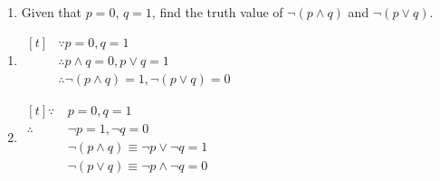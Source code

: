 \documentclass{report}
\begin{document}
\vspace{0.1cm}
\begin{enumerate}[label=\textbf{Example \arabic*}, leftmargin=*, start=13]
    \item Given that $p = 0$, $q = 1$, find the truth value of $\neg (p \land q)$ and
          $\neg (p \lor q)$.
\end{enumerate}

\begin{enumerate}[label=\textbf{Sol. \arabic*}, leftmargin=*]
    \item $\begin{aligned}[t]
                   & \because p = 0, q = 1                                \\
                   & \therefore p \land q = 0, p \lor q = 1               \\
                   & \therefore \neg (p \land q) = 1, \neg (p \lor q) = 0
              \end{aligned}$

    \item $\begin{aligned}[t]
                  \because   & \ p = 0, q = 1                                   \\
                  \therefore & \ \neg p = 1, \neg q = 0                         \\
                             & \ \neg (p \land q) \equiv \neg p \lor \neg q = 1 \\
                             & \ \neg (p \lor q) \equiv \neg p \land \neg q = 0
              \end{aligned}$
\end{enumerate}
\end{document}

